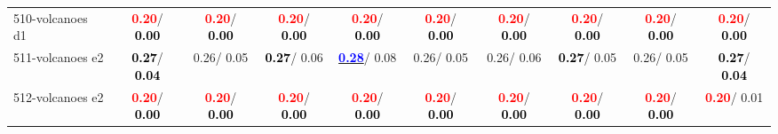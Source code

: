 \begin{table}[h]
\begin{center}
{\begin{tabular}{lc|c|c|c|c|c|c|c|c}
510-volcanoes d1 & \textcolor{red}{\textbf{  0.20}}/\textcolor{black}{\textbf{  0.00}} & \textcolor{red}{\textbf{  0.20}}/\textcolor{black}{\textbf{  0.00}} & \textcolor{red}{\textbf{  0.20}}/\textcolor{black}{\textbf{  0.00}} & \textcolor{red}{\textbf{  0.20}}/\textcolor{black}{\textbf{  0.00}} & \textcolor{red}{\textbf{  0.20}}/\textcolor{black}{\textbf{  0.00}} & \textcolor{red}{\textbf{  0.20}}/\textcolor{black}{\textbf{  0.00}} & \textcolor{red}{\textbf{  0.20}}/\textcolor{black}{\textbf{  0.00}} & \textcolor{red}{\textbf{  0.20}}/\textcolor{black}{\textbf{  0.00}} & \textcolor{red}{\textbf{  0.20}}/\textcolor{black}{\textbf{  0.00}} \\
511-volcanoes e2 & \textcolor{black}{\textbf{  0.27}}/\textcolor{black}{\textbf{  0.04}} &   0.26/  0.05 & \textcolor{black}{\textbf{  0.27}}/  0.06 & \underline{\textcolor{blue}{\textbf{  0.28}}}/  0.08 &   0.26/  0.05 &   0.26/  0.06 & \textcolor{black}{\textbf{  0.27}}/  0.05 &   0.26/  0.05 & \textcolor{black}{\textbf{  0.27}}/\textcolor{black}{\textbf{  0.04}} \\
512-volcanoes e2 & \textcolor{red}{\textbf{  0.20}}/\textcolor{black}{\textbf{  0.00}} & \textcolor{red}{\textbf{  0.20}}/\textcolor{black}{\textbf{  0.00}} & \textcolor{red}{\textbf{  0.20}}/\textcolor{black}{\textbf{  0.00}} & \textcolor{red}{\textbf{  0.20}}/\textcolor{black}{\textbf{  0.00}} & \textcolor{red}{\textbf{  0.20}}/\textcolor{black}{\textbf{  0.00}} & \textcolor{red}{\textbf{  0.20}}/\textcolor{black}{\textbf{  0.00}} & \textcolor{red}{\textbf{  0.20}}/\textcolor{black}{\textbf{  0.00}} & \textcolor{red}{\textbf{  0.20}}/\textcolor{black}{\textbf{  0.00}} & \textcolor{red}{\textbf{  0.20}}/  0.01 \\\end{tabular}}\label{stratsALCKappa15Allallb}
\end{center}
\end{table}
\clearpage
